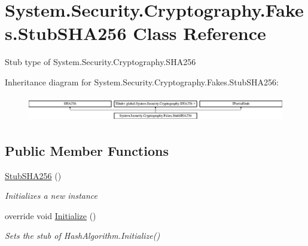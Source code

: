 \hypertarget{class_system_1_1_security_1_1_cryptography_1_1_fakes_1_1_stub_s_h_a256}{\section{System.\-Security.\-Cryptography.\-Fakes.\-Stub\-S\-H\-A256 Class Reference}
\label{class_system_1_1_security_1_1_cryptography_1_1_fakes_1_1_stub_s_h_a256}
}


Stub type of System.\-Security.\-Cryptography.\-S\-H\-A256 


Inheritance diagram for System.\-Security.\-Cryptography.\-Fakes.\-Stub\-S\-H\-A256\-:\begin{figure}[H]
\begin{center}
\leavevmode
\includegraphics[height=1.117764cm]{class_system_1_1_security_1_1_cryptography_1_1_fakes_1_1_stub_s_h_a256}
\end{center}
\end{figure}
\subsection*{Public Member Functions}
\begin{DoxyCompactItemize}
\item 
\hyperlink{class_system_1_1_security_1_1_cryptography_1_1_fakes_1_1_stub_s_h_a256_aecfb8477ff2834ff1f3821d763719264}{Stub\-S\-H\-A256} ()
\begin{DoxyCompactList}\small\item\em Initializes a new instance\end{DoxyCompactList}\item 
override void \hyperlink{class_system_1_1_security_1_1_cryptography_1_1_fakes_1_1_stub_s_h_a256_a651c9017553761f5a43a7e919cfcc735}{Initialize} ()
\begin{DoxyCompactList}\small\item\em Sets the stub of Hash\-Algorithm.\-Initialize()\end{DoxyCompactList}\end{DoxyCompactItemize}
